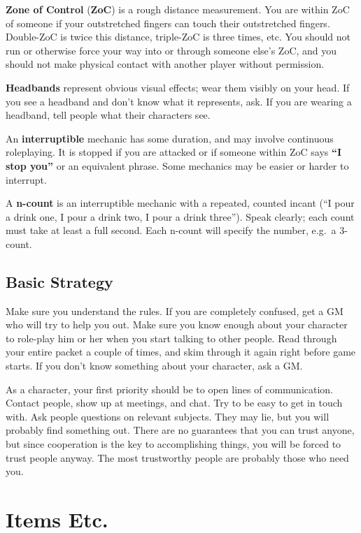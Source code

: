 \documentclass[sheet]{GL2020}
\begin{document}
{\bf Zone of Control} ({\bf ZoC}) is a rough distance measurement. You are within ZoC of someone if your outstretched fingers can touch their outstretched fingers.  Double-ZoC is twice this distance, triple-ZoC is three times, etc. You should not run or otherwise force your way into or through someone else's ZoC, and you should not make physical contact with another player without permission.


{\bf Headbands} represent obvious visual effects; wear them visibly on your head. If you see a headband and don't know what it represents, ask. If you are wearing a headband, tell people what their characters see.

An {\bf interruptible} mechanic has some duration, and may involve continuous roleplaying.  It is stopped if you are attacked or if someone within ZoC says {\bf ``I stop you''} or an equivalent phrase. Some mechanics may be easier or harder to interrupt.

A {\bf n-count} is an interruptible mechanic with a repeated, counted incant (``I pour a drink one, I pour a drink two, I pour a drink three'').  Speak clearly; each count must take at least a full second. Each n-count will specify the number, e.g.\ a 3-count.

\subsection{Basic Strategy}

Make sure you understand the rules.  If you are completely confused, get a GM who will try to help you out.  Make sure you know enough about your character to role-play him or her when you start talking to other people.  Read through your entire packet a couple of times, and skim through it again right before game starts.  If you don't know something about your character, ask a GM.

As a character, your first priority should be to open lines of communication.  Contact people, show up at meetings, and chat.  Try to be easy to get in touch with.  Ask people questions on relevant subjects.  They may lie, but you will probably find something out. There are no guarantees that you can trust anyone, but since cooperation is the key to accomplishing things, you will be forced to trust people anyway.  The most trustworthy people are probably those who need you.

\clearpage
\section{Items Etc.}
\end{document}
